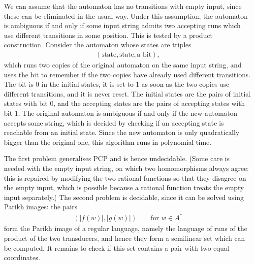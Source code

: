 {
    We can assume that the automaton has no transitions with empty input, since these can be eliminated in the usual way. Under this assumption, the automaton is ambiguous if and only if some input string admits two accepting runs which use different transitions in some position. This is tested by a product construction. Consider the automaton whose states are triples
    \begin{align*}
    (\text{state}, \text{state}, \text{a bit}),
    \end{align*}
    which runs two copies of the original automaton on the same input string, and uses the bit to remember if the two copies have already used different transitions. The bit is $0$ in the initial states, it is set to $1$ as soon as the two copies use different transitions, and it is never reset. The initial states are the pairs of initial states with bit $0$, and the accepting states are the pairs of accepting states with bit $1$. The original automaton is ambiguous if and only if the new automaton accepts some string, which is decided by checking if an accepting state is reachable from an initial state. Since the new automaton is only quadratically bigger than the original one, this algorithm runs in polynomial time.
}

{
    The first problem generalises PCP and is hence undecidable. (Some care is needed with the empty input string, on which two homomorphisms always agree; this is repaired by modifying the two rational functions so that they disagree on the empty input, which is possible because a rational function treats the empty input separately.) The second problem is decidable, since it can be solved using Parikh images: the pairs
    \begin{align*}
    (|f(w)|, |g(w)|) \qquad \text{for $w \in A^*$}
    \end{align*}
    form the Parikh image of a regular language, namely the language of runs of the product of the two transducers, and hence they form a semilinear set which can be computed. It remains to check if this set contains a pair with two equal coordinates.
}

